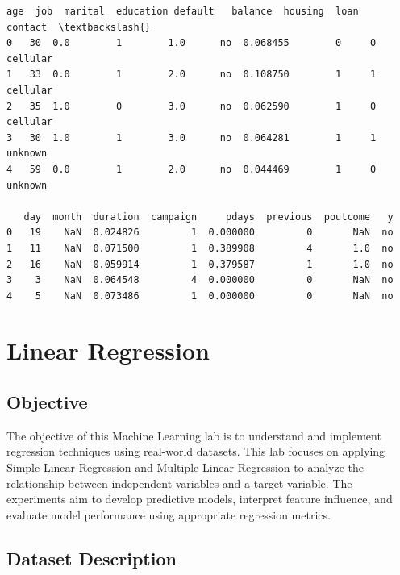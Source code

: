 \documentclass[11pt,a4paper]{report}
\makeatletter
\newcommand{\boxspacing}{\kern\kvtcb@left@rule\kern\kvtcb@boxsep}
\newcommand{\prompt}[4]{
        {\ttfamily\llap{{\color{#2}[#3]:\hspace{3pt}#4}}\vspace{-\baselineskip}}
    }
\makeatother
\begin{document}
            \begin{tcolorbox}[breakable, size=fbox, boxrule=.5pt, pad at break*=1mm, opacityfill=0]
\prompt{Out}{outcolor}{18}{\boxspacing}
\begin{Verbatim}[commandchars=\\\{\}]
   age  job  marital  education default   balance  housing  loan   contact  \textbackslash{}
0   30  0.0        1        1.0      no  0.068455        0     0  cellular
1   33  0.0        1        2.0      no  0.108750        1     1  cellular
2   35  1.0        0        3.0      no  0.062590        1     0  cellular
3   30  1.0        1        3.0      no  0.064281        1     1   unknown
4   59  0.0        1        2.0      no  0.044469        1     0   unknown

   day  month  duration  campaign     pdays  previous  poutcome   y
0   19    NaN  0.024826         1  0.000000         0       NaN  no
1   11    NaN  0.071500         1  0.389908         4       1.0  no
2   16    NaN  0.059914         1  0.379587         1       1.0  no
3    3    NaN  0.064548         4  0.000000         0       NaN  no
4    5    NaN  0.073486         1  0.000000         0       NaN  no
\end{Verbatim}
\end{tcolorbox}




\chapter{Linear Regression}


\section*{Objective}

The objective of this Machine Learning lab is to understand and implement regression techniques using real-world datasets. This lab focuses on applying Simple Linear Regression and Multiple Linear Regression to analyze the relationship between independent variables and a target variable. The experiments aim to develop predictive models, interpret feature influence, and evaluate model performance using appropriate regression metrics.

\section*{Dataset Description}
\end{document}
